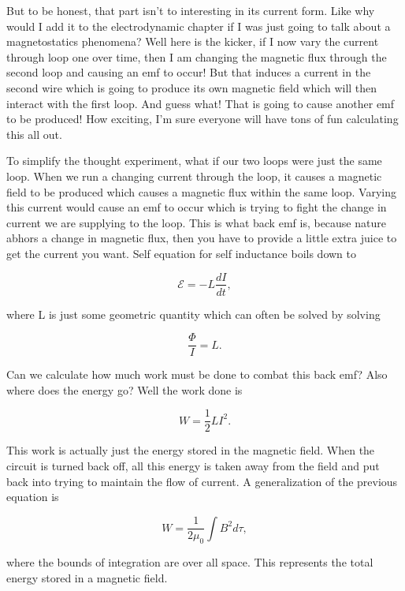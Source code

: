 \documentclass[preprint, review,12pt]{elsarticle}
\def\emf{\mathcal{E}}
\newcommand{\td}[2]{\frac{d #1 }{d #2}}
\begin{document}
But to be honest, that part isn't to interesting in its current form. Like why would I add it to the electrodynamic chapter if I was just going to talk about a magnetostatics phenomena? Well here is the kicker, if I now vary the current through loop one over time, then I am changing the magnetic flux through the second loop and causing an emf to occur! But that induces a current in the second wire which is going to produce its own magnetic field which will then interact with the first loop. And guess what! That is going to cause another emf to be produced! How exciting, I'm sure everyone will have tons of fun calculating this all out.

To simplify the thought experiment, what if our two loops were just the same loop. When we run a changing current through the loop, it causes a magnetic field to be produced which causes a magnetic flux within the same loop. Varying this current would cause an emf to occur which is trying to fight the change in current we are supplying to the loop. This is what back emf is, because nature abhors a change in magnetic flux, then you have to provide a little extra juice to get the current you want. Self equation for self inductance boils down to

\begin{equation}
    \emf = -L\td{I}{t},
\end{equation}

where L is just some geometric quantity which can often be solved by solving

\begin{equation}
    \frac{\Phi}{I} = L.
\end{equation}

Can we calculate how much work must be done to combat this back emf? Also where does the energy go? Well the work done is 

\begin{equation}
    W = \frac{1}{2}LI^2. 
\end{equation}

This work is actually just the energy stored in the magnetic field. When the circuit is turned back off, all this energy is taken away from the field and put back into trying to maintain the flow of current. A generalization of the previous equation is 

\begin{equation}
    W = \frac{1}{2 \mu_0} \int B^2 d\tau,
\end{equation}

where the bounds of integration are over all space. This represents the total energy stored in a magnetic field. 
\end{document}
